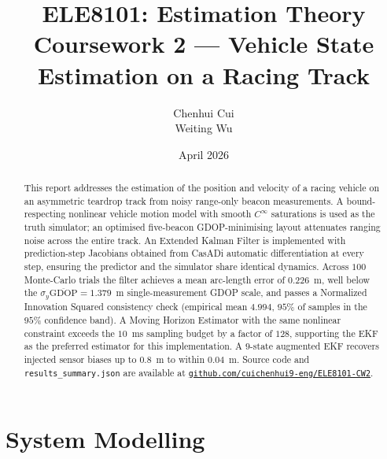 \documentclass[11pt,a4paper]{article}
\title{\vspace{-1.5cm}
       \textbf{ELE8101: Estimation Theory}\\[2pt]
       \large Coursework 2 --- Vehicle State Estimation on a Racing Track}
\author{Chenhui Cui \\ Weiting Wu}
\date{April 2026}
\newcommand{\code}[1]{\texttt{#1}}
\begin{document}
\maketitle
\vspace{-1em}

\begin{abstract}
\noindent
This report addresses the estimation of the position and velocity of
a racing vehicle on an asymmetric teardrop track from noisy
range-only beacon measurements. A bound-respecting nonlinear vehicle
motion model with smooth $C^{\infty}$ saturations is used as the
truth simulator; an optimised five-beacon GDOP-minimising layout
attenuates ranging noise across the entire track. An Extended Kalman
Filter is implemented with prediction-step Jacobians obtained from
CasADi automatic differentiation at every step, ensuring the
predictor and the simulator share identical dynamics. Across $100$
Monte-Carlo trials the filter achieves a mean arc-length error of
$0.226$~m, well below the $\sigma_y\overline{\mathrm{GDOP}}=
1.379$~m single-measurement GDOP scale, and passes a Normalized
Innovation
Squared consistency check (empirical mean $4.994$, $95\%$ of samples
in the $95\%$ confidence band). A Moving Horizon Estimator with the
same nonlinear constraint exceeds the $10$~ms sampling budget by a
factor of $128$, supporting the EKF as the preferred estimator for
this implementation. A $9$-state augmented EKF recovers injected
sensor biases up to $0.8$~m to within $0.04$~m. Source code and
\code{results\_summary.json} are available at
\href{https://github.com/cuichenhui9-eng/ELE8101-CW2}{\texttt{github.com/cuichenhui9-eng/ELE8101-CW2}}.
\end{abstract}

\section{System Modelling}
\label{sec:modelling}
\end{document}
